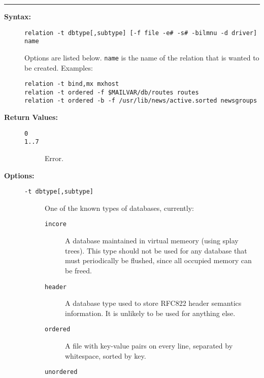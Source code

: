 \hrule
\begin{description}
\item[{\bf Syntax:}] \mbox{}

{\tt relation -t dbtype[,subtype] [-f file -e\# -s\# -bilmnu -d driver] name}

Options are listed below. {\tt name} is the name of the relation
that is wanted to be created. Examples:
\begin{verbatim}
relation -t bind,mx mxhost
relation -t ordered -f $MAILVAR/db/routes routes
relation -t ordered -b -f /usr/lib/news/active.sorted newsgroups
\end{verbatim}




\item[{\bf Return Values:}] \mbox{}

\begin{description}
\item[{\tt 0}] \mbox{}



\item[{\tt 1..7}] \mbox{}

Error.

\end{description}


\item[{\bf Options:}] \mbox{}

\begin{description}
\item[{\tt -t dbtype[,subtype]}] \mbox{}

One of the known types 
of databases, currently: 
\begin{description}
\item[{\tt incore}] \mbox{}

A database maintained in virtual memeory (using 
splay trees). This type should not be used for any database that must 
periodically be flushed, since all occupied memory can be freed.

\item[{\tt header}] \mbox{}

A database type used to store RFC822 header 
semantics information. It is unlikely to be used for anything else.

\item[{\tt ordered}] \mbox{}

A file with key-value pairs on every line, 
separated by whitespace, sorted by key. 

\item[{\tt unordered}] \mbox{}


\end{description}
\end{description}
\end{description}
